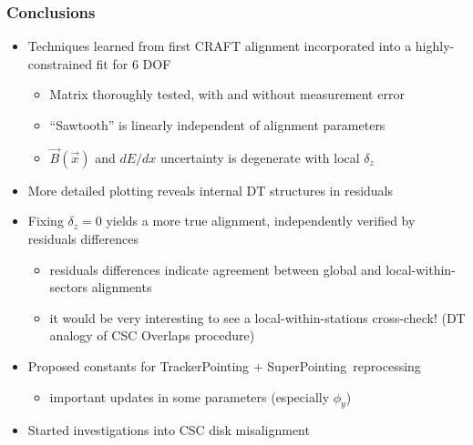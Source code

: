 \documentclass[compress]{beamer}
\begin{document}
\begin{frame}
\frametitle{Conclusions}
\begin{itemize}\setlength{\itemsep}{0.25 cm}
\item Techniques learned from first CRAFT alignment incorporated into
  a highly-constrained fit for 6 DOF
\begin{itemize}\setlength{\itemsep}{0.1 cm}
\item Matrix thoroughly tested, with and without measurement error
\item ``Sawtooth'' is linearly independent of alignment parameters
\item $\vec{B}(\vec{x})$ and $dE/dx$ uncertainty is degenerate with local $\delta_z$
\end{itemize}

\item More detailed plotting reveals internal DT structures in residuals

\item Fixing $\delta_z = 0$ yields a more true alignment,
  independently verified by residuals differences
\begin{itemize}\setlength{\itemsep}{0.1 cm}
\item residuals differences indicate agreement between global and local-within-sectors alignments
\item it would be very interesting to see a local-within-stations cross-check!  (DT analogy of CSC Overlaps procedure)
\end{itemize}

\item Proposed constants for TrackerPointing $+$ \mbox{SuperPointing reprocessing\hspace{-1 cm}}
\begin{itemize}
\item important updates in some parameters (especially $\phi_y$)
\end{itemize}

\item Started investigations into CSC disk misalignment
\end{itemize}
\label{numpages}
\end{frame}

\end{document}
